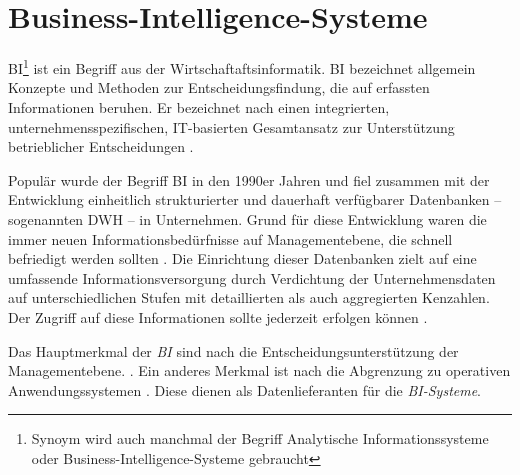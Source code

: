 

\section{Business-Intelligence-Systeme}
\acrfull{BI}\footnote{Synoym wird auch manchmal der Begriff Analytische Informationssysteme oder Business-Intelligence-Systeme gebraucht}
ist ein Begriff aus der Wirtschaftaftsinformatik. BI bezeichnet allgemein Konzepte und Methoden zur Entscheidungsfindung, die auf
erfassten Informationen beruhen.
Er bezeichnet nach \citeauthor{abts_grundkurs_2017} einen integrierten, unternehmensspezifischen,
IT-basierten Gesamtansatz zur Unterstützung betrieblicher Entscheidungen \cite[vgl.][270]{abts_grundkurs_2017}. 

Populär wurde der Begriff \acrshort{BI} in den 1990er Jahren und fiel zusammen mit der 
Entwicklung einheitlich strukturierter und dauerhaft verfügbarer Datenbanken -- sogenannten \acrfull{DWH} -- in Unternehmen.
Grund für diese Entwicklung waren die immer neuen Informationsbedürfnisse auf Managementebene, 
die schnell befriedigt werden sollten \cite[vgl.][268 f.]{abts_grundkurs_2017}.
Die Einrichtung dieser Datenbanken zielt auf eine umfassende Informationsversorgung durch 
Verdichtung der Unternehmensdaten auf unterschiedlichen Stufen mit detaillierten als auch aggregierten Kenzahlen.
Der Zugriff auf diese Informationen sollte jederzeit erfolgen können \cite[vgl.][267]{abts_grundkurs_2017}. 


Das Hauptmerkmal der \textit{\acrshort{BI}} sind nach  die Entscheidungsunterstützung der Managementebene.
\cite[vgl.][111]{linden_geschaftsmodellbasierte_2016}. Ein anderes Merkmal ist nach \citeauthor{abts_grundkurs_2017} die Abgrenzung zu operativen
Anwendungssystemen \cite[vgl.][267]{abts_grundkurs_2017}. Diese dienen als Datenlieferanten für die \textit{\acrshort{BI}-Systeme}.
 
